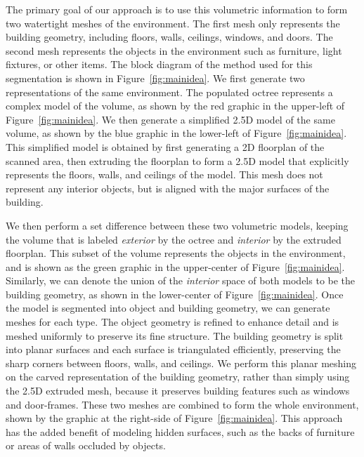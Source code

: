 \documentclass[review]{acmsiggraph}
\begin{document}
The primary goal of our approach is to use this volumetric information to form two watertight meshes of the environment.  The first mesh only represents the building geometry, including floors, walls, ceilings, windows, and doors.  The second mesh represents the objects in the environment such as furniture, light fixtures, or other items.  The block diagram of the method used for this segmentation is shown in Figure~\ref{fig:mainidea}.  We first generate two representations of the same environment.  The populated octree represents a complex model of the volume, as shown by the red graphic in the upper-left of Figure~\ref{fig:mainidea}.  We then generate a simplified 2.5D model of the same volume, as shown by the blue graphic in the lower-left of Figure~\ref{fig:mainidea}.  This simplified model is obtained by first generating a 2D floorplan of the scanned area, then extruding the floorplan to form a 2.5D model that explicitly represents the floors, walls, and ceilings of the model.  This mesh does not represent any interior objects, but is aligned with the major surfaces of the building.

We then perform a set difference between these two volumetric models, keeping the volume that is labeled {\it exterior} by the octree and {\it interior} by the extruded floorplan.  This subset of the volume represents the objects in the environment, and is shown as the green graphic in the upper-center of Figure~\ref{fig:mainidea}.  Similarly, we can denote the union of the {\it interior} space of both models to be the building geometry, as shown in the lower-center of Figure~\ref{fig:mainidea}.  Once the model is segmented into object and building geometry, we can generate meshes for each type.  The object geometry is refined to enhance detail and is meshed uniformly to preserve its fine structure.  The building geometry is split into planar surfaces and each surface is triangulated efficiently, preserving the sharp corners between floors, walls, and ceilings.  We perform this planar meshing on the carved representation of the building geometry, rather than simply using the 2.5D extruded mesh, because it preserves building features such as windows and door-frames.  These two meshes are combined to form the whole environment, shown by the graphic at the right-side of Figure~\ref{fig:mainidea}.  This approach has the added benefit of modeling hidden surfaces, such as the backs of furniture or areas of walls occluded by objects.
\end{document}
